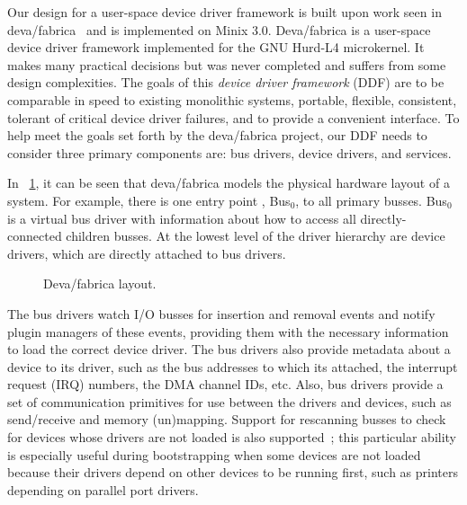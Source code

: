 
Our design for a user-space device driver framework is built upon work seen in
deva/fabrica~\cite{hurdl4ref2003} and is implemented on Minix 3.0.
%
%
Deva/fabrica is a user-space device driver framework implemented
for the GNU Hurd-L4 microkernel.	
It makes many practical decisions but was never completed and
suffers from some design complexities.  The goals of this {\em device driver framework} (DDF) are to be
comparable in speed to existing monolithic systems, portable, flexible,
consistent, tolerant of critical device driver
failures, and to provide a convenient interface.  To help meet the goals set
forth by the deva/fabrica project, our DDF needs to consider three primary components are: bus drivers, device drivers, and services. 

In \figurename~\ref{fig:deva_layout}, it can be seen that deva/fabrica models
the physical hardware layout of a system.  For example, there is one entry
point
, Bus$_0$, to all primary busses.  Bus$_0$ is a
virtual bus driver
with information about how to access all directly-connected
children busses.  At the lowest level of the driver hierarchy are device
drivers, which are directly attached to bus drivers.

	\begin{figure}[tb]
	\begin{center}
	\end{center}
	\caption{Deva/fabrica layout.}%
	\label{fig:deva_layout}
	\end{figure}


The bus drivers watch I/O busses for insertion and removal events and notify
plugin managers of these events, providing them with the necessary information
to load the correct device driver.  The bus drivers also provide metadata
about a device to its driver, such as the bus addresses to which its
attached, the interrupt request (IRQ) numbers, the DMA channel IDs, etc.
Also, bus drivers provide a set of communication primitives for use between
the drivers and devices, such as send/receive and memory (un)mapping.  Support
for rescanning busses to check for devices whose drivers are not loaded is also
supported~\cite{hurdl4ref2003}; this particular ability is especially useful
during bootstrapping when some devices are not loaded because their drivers
depend on other devices to be running first, such as printers depending on
parallel port drivers.  

